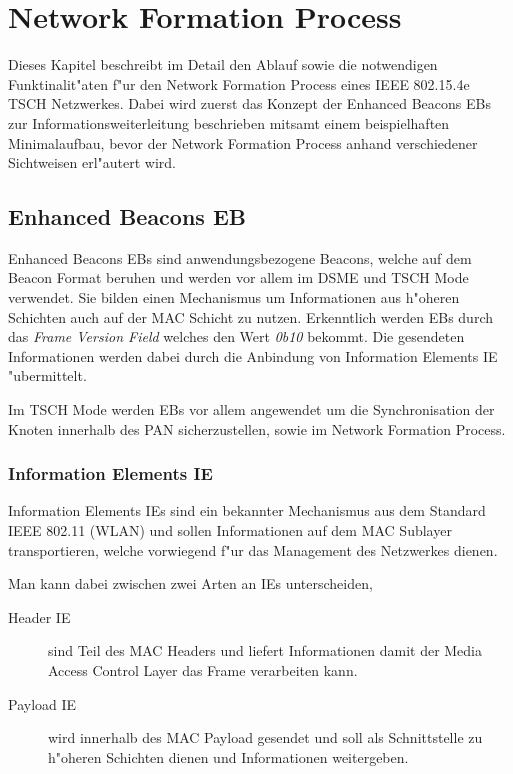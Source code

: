 \section{Network Formation Process} \label{Kap5-5}

Dieses Kapitel beschreibt im Detail den Ablauf sowie die notwendigen Funktinalit"aten
f"ur den Network Formation Process eines IEEE 802.15.4e TSCH Netzwerkes.
Dabei wird zuerst das Konzept der Enhanced Beacons
EBs zur Informationsweiterleitung beschrieben mitsamt einem beispielhaften
Minimalaufbau, bevor der Network Formation Process anhand verschiedener
Sichtweisen erl"autert wird.

\subsection{Enhanced Beacons EB}

Enhanced Beacons EBs sind anwendungsbezogene Beacons, welche auf dem
Beacon Format beruhen und werden vor allem im DSME und TSCH Mode verwendet.
Sie bilden einen Mechanismus um Informationen aus h"oheren Schichten auch auf
der MAC Schicht zu nutzen. Erkenntlich werden EBs durch das \textit{Frame Version Field}
welches den Wert \textit{0b10} bekommt. Die gesendeten Informationen werden dabei
durch die Anbindung von Information Elements IE "ubermittelt.

Im TSCH Mode werden EBs vor allem angewendet um die Synchronisation der Knoten
innerhalb des PAN sicherzustellen, sowie im Network Formation Process.

\subsubsection{Information Elements IE}
\label{subsec:IE}

Information Elements IEs sind ein bekannter Mechanismus aus dem Standard IEEE
802.11 (WLAN) und sollen Informationen auf dem MAC Sublayer transportieren,
welche vorwiegend f"ur das Management des Netzwerkes dienen.

Man kann dabei zwischen zwei Arten an IEs unterscheiden,

\begin{description}
  \item[Header IE] sind Teil des MAC Headers und liefert Informationen damit der
  Media Access Control Layer das Frame verarbeiten kann.
  \item[Payload IE] wird innerhalb des MAC Payload gesendet und soll als
  Schnittstelle zu h"oheren Schichten dienen und Informationen weitergeben.
\end{description}

